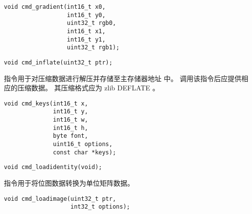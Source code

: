 \begin{framed}
\begin{verbatim}
void cmd_gradient(int16_t x0,
                  int16_t y0,
                  uint32_t rgb0,
                  int16_t x1,
                  int16_t y1,
                  uint32_t rgb1);
\end{verbatim}
\end{framed}




\begin{framed}
\begin{verbatim}
void cmd_inflate(uint32_t ptr);
\end{verbatim}
\end{framed}

 指令用于对压缩数据进行解压并存储至主存储器地址  中。
调用该指令后应提供相应的压缩数据。
其压缩格式应为 zlib DEFLATE 。



\begin{framed}
\begin{verbatim}
void cmd_keys(int16_t x,
              int16_t y,
              int16_t w,
              int16_t h,
              byte font,
              uint16_t options,
              const char *keys);
\end{verbatim}
\end{framed}



\begin{framed}
\begin{verbatim}
void cmd_loadidentity(void);
\end{verbatim}
\end{framed}

 指令用于将位图数据转换为单位矩阵数据。


\begin{framed}
\begin{verbatim}
void cmd_loadimage(uint32_t ptr,
                   int32_t options);
\end{verbatim}
\end{framed}


